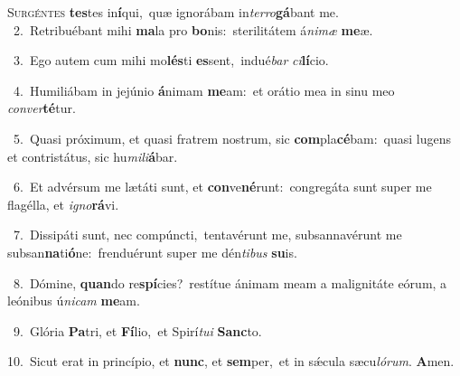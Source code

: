 \lettrine{\initial\textcolor{\initialcolor}{S}}{urgéntes} \textbf{tes}\-tes in\-\textbf{í}\-qui,~\star quæ ignorábam in\-\textit{ter}\-\textit{ro}\textbf{gá}bant me.\\
{\numbfont\textcolor{\numbcolor}{~2.}}~Retribuébant mihi \textbf{ma}\-la pro \textbf{bo}\-nis:~\star sterilitátem á\-\textit{ni}\-\textit{mæ} \textbf{me}\-æ.\par
{\numbfont\textcolor{\numbcolor}{~3.}}~Ego autem cum mihi mo\-\textbf{lés}\-ti \textbf{es}\-sent,~\star indué\textit{bar} \textit{ci}\-\textbf{lí}cio.\par
{\numbfont\textcolor{\numbcolor}{~4.}}~Humiliábam in jejúnio \textbf{á}\-nimam \textbf{me}\-am:~\star et orátio mea in sinu meo \textit{con}\-\textit{ver}\textbf{té}tur.\par
{\numbfont\textcolor{\numbcolor}{~5.}}~Quasi próximum, et quasi fratrem nostrum, sic \textbf{com}\-pla\-\textbf{cé}\-bam:~\star quasi lugens et contristátus, sic hu\-\textit{mi}\-\textit{li}\textbf{á}bar.\par
{\numbfont\textcolor{\numbcolor}{~6.}}~Et advérsum me lætáti sunt, et \textbf{con}\-ve\-\textbf{né}\-runt:~\star congregáta sunt super me flagélla, et \textit{i}\-\textit{gno}\textbf{rá}vi.\par
{\numbfont\textcolor{\numbcolor}{~7.}}~Dissipáti sunt, nec compúncti,~\dagger tentavérunt me, subsannavérunt me subsan\-\textbf{na}\-ti\-\textbf{ó}\-ne:~\star frenduérunt super me dén\-\textit{ti}\-\textit{bus} \textbf{su}\-is.\par
{\numbfont\textcolor{\numbcolor}{~8.}}~Dómine, \textbf{quan}\-do re\-\textbf{spí}\-cies?~\star restítue ánimam meam a malignitáte eórum, a leónibus ú\-\textit{ni}\-\textit{cam} \textbf{me}\-am.\par
{\numbfont\textcolor{\numbcolor}{~9.}}~Glória \textbf{Pa}\-tri, et \textbf{Fí}\-lio,~\star et Spirí\-\textit{tu}\-\textit{i} \textbf{Sanc}\-to.\par
{\numbfont\textcolor{\numbcolor}{10.}}~Sicut erat in princípio, et \textbf{nunc}\-, et \textbf{sem}\-per,~\star et in sǽcula sæcu\-\textit{ló}\-\textit{rum}. \textbf{A}\-men.\par
